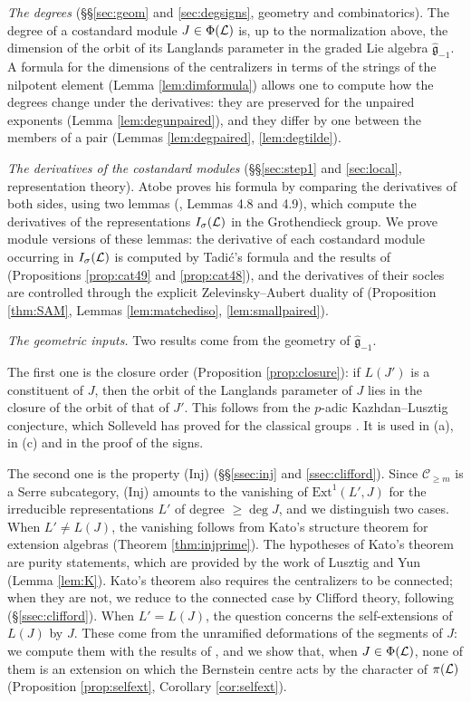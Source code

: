 \documentclass[a4paper,12pt,leqno]{amsart}
\theoremstyle{plain}
\theoremstyle{definition}
\begin{document}
\emph{The degrees} (\S\S\ref{sec:geom} and \ref{sec:degsigns}, geometry and combinatorics). The degree of
a costandard module $J\in\Phi(\mathcal{L})$ is, up to the normalization above, the dimension of the orbit of
its Langlands parameter in the graded Lie algebra $\widehat{\mathfrak g}_{-1}$. A formula for the dimensions of the
centralizers in terms of the strings of the nilpotent element (Lemma \ref{lem:dimformula}) allows one to
compute how the degrees change under the derivatives: they are preserved for the unpaired exponents (Lemma
\ref{lem:degunpaired}), and they differ by one between the members of a pair (Lemmas \ref{lem:degpaired},
\ref{lem:degtilde}).

\emph{The derivatives of the costandard modules} (\S\S\ref{sec:step1} and \ref{sec:local},
representation theory). Atobe proves his formula by comparing the derivatives of both sides, using two
lemmas (\cite{Ato24}, Lemmas 4.8 and 4.9), which compute the derivatives of the representations
$I_\sigma(\mathcal{L})$ in the Grothendieck group. We prove module versions of these lemmas: the derivative of
each costandard module occurring in $I_\sigma(\mathcal{L})$ is computed by Tadi\'c's formula and the results of \cite{Xu17} (Propositions \ref{prop:cat49} and \ref{prop:cat48}), and the derivatives of their socles are controlled
through the explicit Zelevinsky--Aubert duality of \cite{AM23} (Proposition \ref{thm:SAM}, Lemmas
\ref{lem:matchediso}, \ref{lem:smallpaired}).

\emph{The geometric inputs.} Two results come from the geometry of $\widehat{\mathfrak g}_{-1}$.

The first one is the closure order (Proposition \ref{prop:closure}): if $L(J')$ is a constituent of $J$,
then the orbit of the Langlands parameter of $J$ lies in the closure of the orbit of that of $J'$. This
follows from the $p$-adic Kazhdan--Lusztig conjecture, which Solleveld has proved for the classical
groups \cite{Sol25}. It is used in (a), in (c) and in the proof of the signs.

The second one is the property (Inj) (\S\S\ref{ssec:inj} and \ref{ssec:clifford}). Since
$\mathcal C_{\geq m}$ is a Serre subcategory, (Inj) amounts to the vanishing of $\mathrm{Ext}^1(L',J)$
for the irreducible representations $L'$ of degree $\geq\deg J$, and we distinguish two cases. When
$L'\neq L(J)$, the vanishing follows from Kato's structure theorem for extension algebras \cite{Kat17}
(Theorem \ref{thm:injprime}). The hypotheses of Kato's theorem are purity statements, which are provided
by the work of Lusztig and Yun (Lemma \ref{lem:K}). Kato's theorem also requires the centralizers to be
connected; when they are not, we reduce to the connected case by Clifford theory, following
\cite{AMS18} (\S\ref{ssec:clifford}). When $L'=L(J)$, the question concerns the self-extensions of
$L(J)$ by $J$. These come from the unramified deformations of the segments of $J$: we compute them
with the results of \cite{OS13}, and we show that, when $J\in\Phi(\mathcal{L})$, none of them is an extension on
which the Bernstein centre acts by the character of $\pi(\mathcal{L})$ (Proposition \ref{prop:selfext}, Corollary \ref{cor:selfext}).
\end{document}
